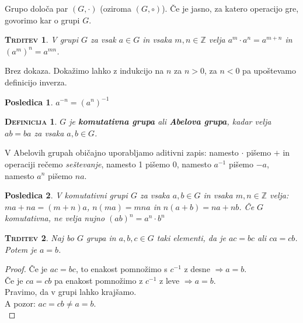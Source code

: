 \documentclass[a4paper,12pt]{article}
\newtheorem*{trditev}{\textsc{Trditev}}
\newtheorem*{posl}{Posledica}
\newtheorem*{definicija}{\textsc{Definicija}}
\begin{document}
\noindent Grupo določa par $(G,\cdot)$ (oziroma $(G,\circ)$). Če je jasno, za katero operacijo gre, govorimo kar o grupi $G$. \\

\begin{trditev}
V grupi $G$ za vsak $a\in G$ in vsaka $m,n\in \mathbb{Z}$ velja $a^m \cdot a^n=a^{m+n}$ in $(a^m)^n=a^{mn}$.\\
\end{trditev}

\noindent Brez dokaza. Dokažimo lahko z indukcijo na $n$ za $n>0$, za $n<0$ pa upoštevamo definicijo inverza.\\

\begin{posl}
$a^{-n}=(a^n)^{-1}$\\
\end{posl}

\begin{definicija}
$G$ je \textbf{komutativna grupa} ali \textbf{Abelova grupa}, kadar velja $ab=ba$ za vsaka $a,b\in G$.\\
\end{definicija}

\noindent V Abelovih grupah običajno uporabljamo aditivni zapis: namesto $\cdot$  pišemo $+$ in operaciji rečemo \textit{seštevanje}, namesto 1 pišemo 0, namesto $a^{-1}$ pišemo $-a$, namesto $a^n$ pišemo $na$.\\

\begin{posl}
V komutativni grupi $G$ za vsaka $a,b\in G$ in vsaka $m,n\in \mathbb{Z}$ velja: \linebreak $ma+na=(m+n)a$, $n(ma)=mna$ in $n(a+b)=na+nb$. Če $G$ komutativna, ne velja nujno $(ab)^n=a^n \cdot b^n$\\
\end{posl}

\begin{trditev}
Naj bo $G$ grupa in $a,b,c\in G$ taki elementi, da je $ac=bc$ ali $ca=cb$. Potem je $a=b$.\\
\end{trditev}

\begin{proof}
Če je $ac=bc$, to enakost pomnožimo s $c^{-1}$ z desne $\Rightarrow a=b$. \\

Če je $ca=cb$ pa enakost pomnožimo z $c^{-1}$ z leve $\Rightarrow a=b$. \\

Pravimo, da v grupi lahko krajšamo. \\

A pozor: $ac=cb \neq a=b$.\\
\end{proof}
\end{document}
